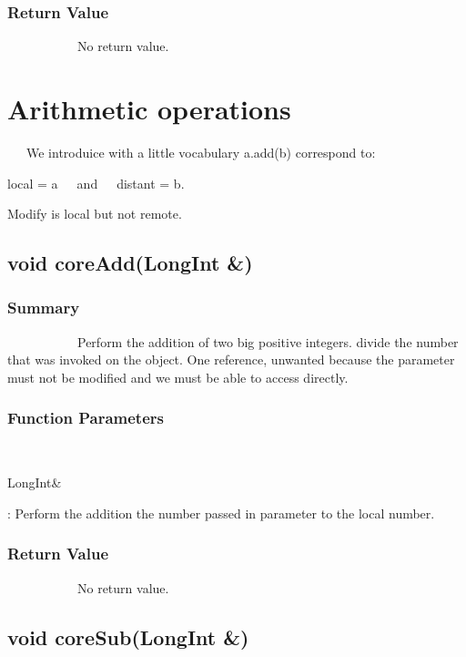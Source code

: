 \documentclass[11pt]{report}
\begin{document}
\subsection{Return Value}

~~~~~~~~~~~No return value.

    \chapter*{Arithmetic operations}  

      \begin{bf}
~~~We introduice with a little vocabulary
a.add(b) correspond to: \begin{center}  local = a~~~and~~~distant = b. \end{center}
\begin{center}Modify is local but not remote.\end{center}
    \end{bf}


\section{void coreAdd(LongInt \&)}
	\subsection{Summary}
~~~~~~~~~~~Perform the addition of two big positive integers.
divide the number that was invoked on the object.
One reference, unwanted because the parameter must not be modified and
we must be able to access directly.
	\subsection{Function Parameters}
~~~~~~~~~~~\begin{bf}LongInt\&\end{bf}: Perform the addition the number passed in parameter to the local number.

\subsection{Return Value}
~~~~~~~~~~~No return value.

\section{void coreSub(LongInt \&)}
\end{document}
